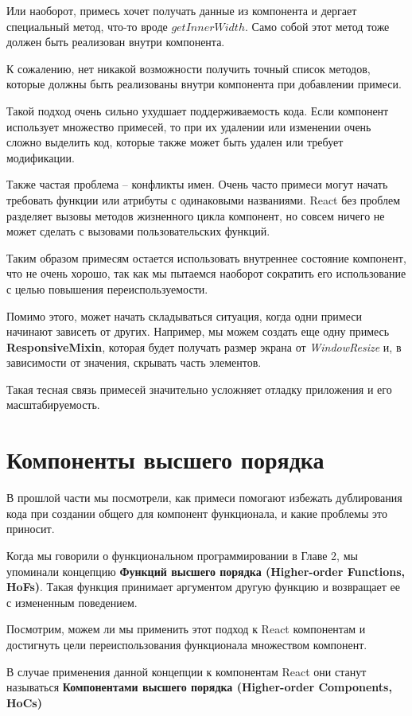 Или наоборот, примесь хочет получать данные из компонента и дергает специальный метод, что-то вроде $getInnerWidth$. Само собой этот метод тоже должен быть реализован внутри компонента.

К сожалению, нет никакой возможности получить точный список методов, которые должны быть реализованы внутри компонента при добавлении примеси.

Такой подход очень сильно ухудшает поддерживаемость кода. Если компонент использует множество примесей, то при их удалении или изменении очень сложно выделить код, которые также может быть удален или требует модификации.

Также частая проблема -- конфликты имен. Очень часто примеси могут начать требовать функции или атрибуты с одинаковыми названиями. React без проблем разделяет вызовы методов жизненного цикла компонент, но совсем ничего не может сделать с вызовами пользовательских функций.

Таким образом примесям остается использовать внутреннее состояние компонент, что не очень хорошо, так как мы пытаемся наоборот сократить его использование с целью повышения переиспользуемости.

Помимо этого, может начать складываться ситуация, когда одни примеси начинают зависеть от других. Например, мы можем создать еще одну примесь \textbf{ResponsiveMixin}, которая будет получать размер экрана от \textit{WindowResize} и, в зависимости от значения, скрывать часть элементов.

Такая тесная связь примесей значительно усложняет отладку приложения и его масштабируемость. 

\section{Компоненты высшего порядка}

В прошлой части мы посмотрели, как примеси помогают избежать дублирования кода при создании общего для компонент функционала, и какие проблемы это приносит.

Когда мы говорили о функциональном программировании в Главе 2, мы упоминали концепцию \textbf{Функций высшего порядка (Higher-order Functions, HoFs)}. Такая функция принимает аргументом другую функцию и возвращает ее с измененным поведением.

Посмотрим, можем ли мы применить этот подход к React компонентам и достигнуть цели переиспользования функционала множеством компонент.

В случае применения данной концепции к компонентам React они станут называться \textbf{Компонентами высшего порядка (Higher-order Components, HoCs)}

